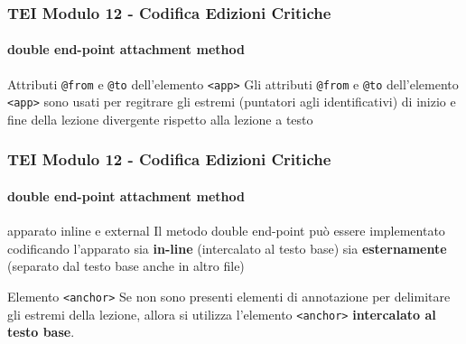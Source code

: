 \begin{frame}
    \frametitle{TEI Modulo 12 - Codifica Edizioni Critiche}
    \framesubtitle{double end-point attachment method}
    \addtocounter{nframe}{1}
    



    \begin{block}{Attributi \texttt{@from} e \texttt{@to} dell'elemento \texttt{<app>}}
      Gli attributi \texttt{@from} e \texttt{@to} dell'elemento \texttt{<app>} sono usati per regitrare gli estremi (puntatori agli identificativi) di inizio e fine della lezione divergente rispetto alla lezione a testo
    \end{block}
    

\end{frame}


\begin{frame}
    \frametitle{TEI Modulo 12 - Codifica Edizioni Critiche}
    \framesubtitle{double end-point attachment method}
    \addtocounter{nframe}{1}
    


   

    \begin{block}{apparato inline e external}
      Il metodo double end-point può essere implementato codificando l'apparato sia \textbf{in-line} (intercalato al testo base) sia \textbf{esternamente} (separato dal testo base anche in altro file)  
    \end{block}
    
    \begin{block}{Elemento \texttt{<anchor>}}
        Se non sono presenti elementi di annotazione per delimitare gli estremi della lezione, allora si utilizza l'elemento \texttt{<anchor>} \textbf{intercalato al testo base}.
     \end{block}

\end{frame}


